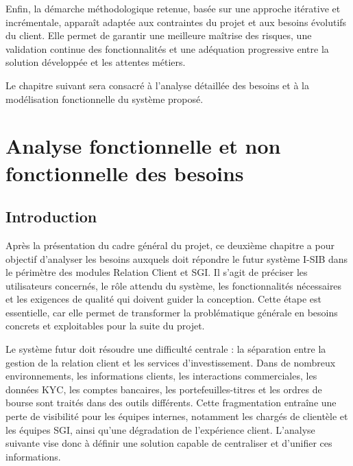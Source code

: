 \documentclass[a4paper,12pt]{report}
\begin{document}
Enfin, la démarche méthodologique retenue, basée sur une approche itérative et incrémentale, apparaît adaptée aux contraintes du projet et aux besoins évolutifs du client. Elle permet de garantir une meilleure maîtrise des risques, une validation continue des fonctionnalités et une adéquation progressive entre la solution développée et les attentes métiers.

Le chapitre suivant sera consacré à l'analyse détaillée des besoins et à la modélisation fonctionnelle du système proposé.

\chapter{Analyse fonctionnelle et non fonctionnelle des besoins}

\section*{Introduction}
{}

Après la présentation du cadre général du projet, ce deuxième chapitre a pour objectif
d'analyser les besoins auxquels doit répondre le futur système I-SIB dans le périmètre des
modules Relation Client et SGI. Il s'agit de préciser les utilisateurs concernés, le rôle
attendu du système, les fonctionnalités nécessaires et les exigences de qualité qui doivent
guider la conception. Cette étape est essentielle, car elle permet de transformer la
problématique générale en besoins concrets et exploitables pour la suite du projet.

Le système futur doit résoudre une difficulté centrale : la séparation entre la gestion de
la relation client et les services d'investissement. Dans de nombreux environnements, les
informations clients, les interactions commerciales, les données KYC, les comptes bancaires,
les portefeuilles-titres et les ordres de bourse sont traités dans des outils différents.
Cette fragmentation entraîne une perte de visibilité pour les équipes internes, notamment
les chargés de clientèle et les équipes SGI, ainsi qu'une dégradation de l'expérience
client. L'analyse suivante vise donc à définir une solution capable de centraliser et
d'unifier ces informations.
\end{document}
